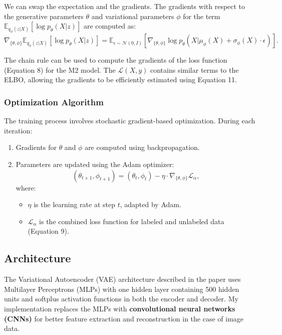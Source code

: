 \documentclass{article}
\begin{document}
We can swap the expectation and the gradients. The gradients with respect to the generative parameters $\theta$ and variational parameters $\phi$ for the term $\mathbb{E}_{q_\phi(z|X)}[\log p_\theta(X|z)]$ are computed as:
\[
\nabla_{\{\theta, \phi\}} \mathbb{E}_{q_\phi(z|X)}[\log p_\theta(X|z)] = \mathbb{E}_{\epsilon \sim \mathcal{N}(0, I)}[\nabla_{\{\theta, \phi\}} \log p_\theta(X | \mu_\phi(X) + \sigma_\phi(X) \cdot \epsilon)]. \tag{11}
\]

The chain rule can be used to compute the gradients of the loss function (Equation 8) for the M2 model. The $\mathcal{L}(X, y)$ contains similar terms to the ELBO, allowing the gradients to be efficiently estimated using Equation 11.

\subsubsection*{Optimization Algorithm}

The training process involves stochastic gradient-based optimization. During each iteration:
\begin{enumerate}
    \item Gradients for $\theta$ and $\phi$ are computed using backpropagation.
    \item Parameters are updated using the Adam optimizer:
    \[
    (\theta_{t+1}, \phi_{t+1}) = (\theta_t, \phi_t) - \eta \cdot \nabla_{\{\theta, \phi\}} \mathcal{L}_\alpha,
    \]
    where:
    \begin{itemize}
        \item $\eta$ is the learning rate at step $t$, adapted by Adam.
        \item $\mathcal{L}_\alpha$ is the combined loss function for labeled and unlabeled data (Equation 9).
    \end{itemize}
\end{enumerate}

\subsection*{Architecture}

The Variational Autoencoder (VAE) architecture described in the paper uses Multilayer Perceptrons (MLPs) with one hidden layer containing 500 hidden units and softplus activation functions in both the encoder and decoder. My implementation replaces the MLPs with \textbf{convolutional neural networks (CNNs)} for better feature extraction and reconstruction in the case of image data.
\end{document}
